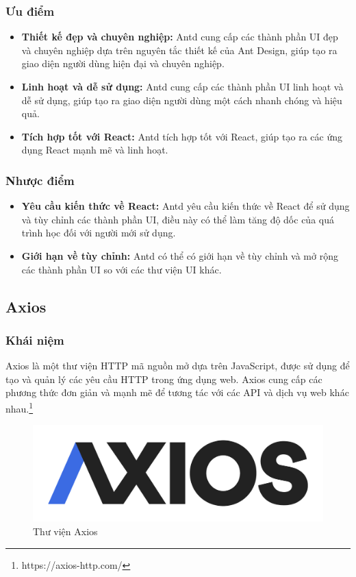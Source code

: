 \subsubsection{Ưu điểm}
\begin{itemize}
  \item \textbf{Thiết kế đẹp và chuyên nghiệp:} Antd cung cấp các thành phần UI đẹp và chuyên nghiệp dựa trên nguyên tắc thiết kế của Ant Design, giúp tạo ra giao diện người dùng hiện đại và chuyên nghiệp.
  \item \textbf{Linh hoạt và dễ sử dụng:} Antd cung cấp các thành phần UI linh hoạt và dễ sử dụng, giúp tạo ra giao diện người dùng một cách nhanh chóng và hiệu quả.
  \item \textbf{Tích hợp tốt với React:} Antd tích hợp tốt với React, giúp tạo ra các ứng dụng React mạnh mẽ và linh hoạt.
\end{itemize}
\subsubsection{Nhược điểm}
\begin{itemize}
  \item \textbf{Yêu cầu kiến thức về React:} Antd yêu cầu kiến thức về React để sử dụng và tùy chỉnh các thành phần UI, điều này có thể làm tăng độ dốc của quá trình học đối với người mới sử dụng.
  \item \textbf{Giới hạn về tùy chỉnh:} Antd có thể có giới hạn về tùy chỉnh và mở rộng các thành phần UI so với các thư viện UI khác.
\end{itemize}
\subsection{Axios}
\subsubsection{Khái niệm}
\noindent Axios là một thư viện HTTP mã nguồn mở dựa trên JavaScript, được sử dụng để tạo và quản lý các yêu cầu HTTP trong ứng dụng web. Axios cung cấp các phương thức đơn giản và mạnh mẽ để tương tác với các API và dịch vụ web khác nhau.\footnote{https://axios-http.com/}
\begin{figure}[H]
  \begin{center}
    \includegraphics[scale=0.2]{images/hieu/phuluc/axios.png}
    \caption{Thư viện Axios}
  \end{center}
\end{figure}
